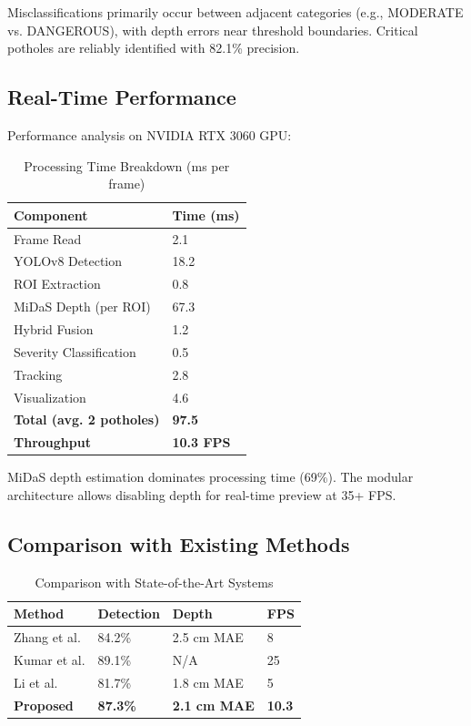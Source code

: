 \documentclass[conference]{IEEEtran}
\begin{document}
Misclassifications primarily occur between adjacent categories (e.g., MODERATE vs. DANGEROUS), with depth errors near threshold boundaries. Critical potholes are reliably identified with 82.1\% precision.

\subsection{Real-Time Performance}

Performance analysis on NVIDIA RTX 3060 GPU:

\begin{table}[h]
\centering
\caption{Processing Time Breakdown (ms per frame)}
\begin{tabular}{@{}ll@{}}
\toprule
\textbf{Component} & \textbf{Time (ms)} \\ \midrule
Frame Read & 2.1 \\
YOLOv8 Detection & 18.2 \\
ROI Extraction & 0.8 \\
MiDaS Depth (per ROI) & 67.3 \\
Hybrid Fusion & 1.2 \\
Severity Classification & 0.5 \\
Tracking & 2.8 \\
Visualization & 4.6 \\
\midrule
\textbf{Total (avg. 2 potholes)} & \textbf{97.5} \\
\textbf{Throughput} & \textbf{10.3 FPS} \\ \bottomrule
\end{tabular}
\end{table}

MiDaS depth estimation dominates processing time (69\%). The modular architecture allows disabling depth for real-time preview at 35+ FPS.

\subsection{Comparison with Existing Methods}

\begin{table}[h]
\centering
\caption{Comparison with State-of-the-Art Systems}
\begin{tabular}{@{}llll@{}}
\toprule
\textbf{Method} & \textbf{Detection} & \textbf{Depth} & \textbf{FPS} \\ \midrule
Zhang et al. \cite{zhang_severity} & 84.2\% & 2.5 cm MAE & 8 \\
Kumar et al. \cite{kumar_yolo} & 89.1\% & N/A & 25 \\
Li et al. \cite{li_stereo} & 81.7\% & 1.8 cm MAE & 5 \\
\textbf{Proposed} & \textbf{87.3\%} & \textbf{2.1 cm MAE} & \textbf{10.3} \\ \bottomrule
\end{tabular}
\end{table}
\end{document}
